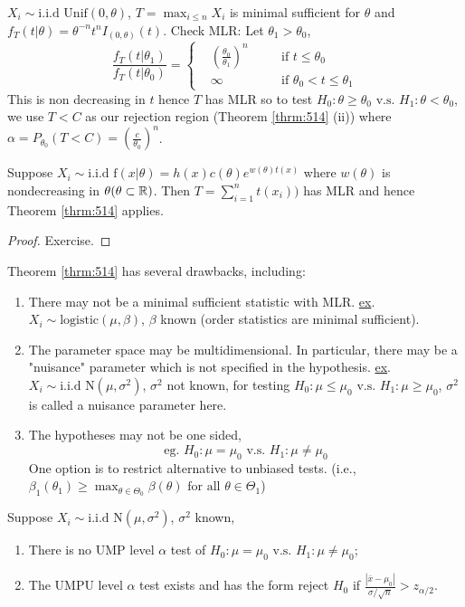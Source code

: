 \documentclass[english, 11pt]{article}
\begin{document}
\begin{exmp}\label{exmp:516}
$X_i\sim\text{i.i.d~Unif}(0, \theta)$, $T=\max_{i\leqslant n}X_i$ is minimal sufficient for $\theta$ and $f_T(t|\theta)=\theta^{-n}t^nI_{(0, \theta)}(t)$. Check MLR: Let $\theta_1>\theta_0$, 
$$
\frac{f_T(t|\theta_1)}{f_T(t|\theta_0)}=\left\{\begin{aligned}&\left(\frac{\theta_0}{\theta_1}\right)^n&\quad&\text{if }t\leqslant\theta_0\\
&\infty&\quad&\text{if }\theta_0<t\leqslant\theta_1\end{aligned}\right.
$$
This is non decreasing in $t$ hence $T$ has MLR so to test $H_0:\theta\geqslant\theta_0\text{ v.s. }H_1:\theta<\theta_0$, we use $T<C$ as our rejection region (Theorem \ref{thrm:514} (ii)) where $\alpha=P_{\theta_0}(T<C)=\left(\frac{c}{\theta_0}\right)^n$.
\end{exmp}

\begin{thrm}\label{thrm:517}
Suppose $X_i\sim\text{i.i.d~f}(x|\theta)=h(x)c(\theta)e^{w(\theta)t(x)}$ where $w(\theta)$ is nondecreasing in $\theta(\theta\subset{\mathbb{R}})$. Then $T=\sum_{i=1}^nt(x_i))$ has MLR and hence Theorem \ref{thrm:514} applies.
\end{thrm}
\begin{proof}Exercise.
\end{proof}

Theorem \ref{thrm:514} has several drawbacks, including:
\begin{enumerate}
\item There may not be a minimal sufficient statistic with MLR. \underline{ex}. $X_i\sim\text{logistic}(\mu, \beta)$, $\beta$ known (order statistics are minimal sufficient).
\item The parameter space may be multidimensional. In particular, there may be a "nuisance" parameter which is not specified in the hypothesis. \underline{ex}. $X_i\sim\text{i.i.d N}(\mu, \sigma^2)$, $\sigma^2$ not known, for testing $H_0:\mu\leqslant\mu_0\text{ v.s. }H_1:\mu\geqslant\mu_0$, $\sigma^2$ is called a nuisance parameter here.
\item The hypotheses may not be one sided, 
$$
\text{eg.   }H_0:\mu=\mu_0\text{ v.s. }H_1:\mu\not=\mu_0
$$
One option is to restrict alternative to unbiased tests. (i.e., $\beta_1(\theta_1)\geqslant\max_{\theta\in\Theta_0}\beta(\theta)\text{ for all }\theta\in\Theta_1$)
\end{enumerate}


\begin{thrm}\label{thrm:518}
Suppose $X_i\sim\text{i.i.d N}(\mu,\sigma^2)$, $\sigma^2$ known,
\begin{enumerate}
\item There is no UMP level $\alpha$ test of $H_0:\mu=\mu_0\text{ v.s. }H_1:\mu\not=\mu_0$;
\item The UMPU level $\alpha$ test exists and has the form reject $H_0$ if $\frac{|\bar{x}-\mu_0|}{\sigma/\sqrt{n}}>z_{\alpha/2}$.
\end{enumerate}
\end{thrm}
\end{document}
